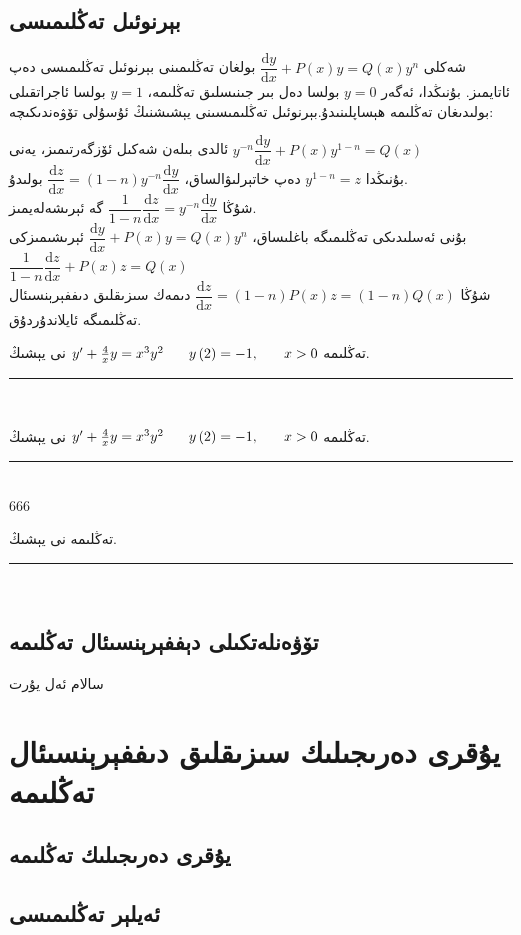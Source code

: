 \subsection{بېرنوئىل تەڭلىمىسى}
شەكلى
$\dfrac{\textrm{d}y}{\textrm{d}x}+P(x)y=Q(x)y^n$
بولغان تەڭلىمىنى بېرنوئىل تەڭلىمىسى دەپ ئاتايمىز. بۇنىڭدا، ئەگەر $y=0$ بولسا دەل بىر جىنىسلىق تەڭلىمە، $y=1$ بولسا ئاجراتقىلى بولىدىغان تەڭلىمە ھېساپلىنىدۇ.بېرنوئىل تەڭلىمىسىنى يېشىشنىڭ ئۇسۇلى تۆۋەندىكىچە:
\begin{colorful}[cyan]
ئالدى بىلەن شەكىل ئۆزگەرتىمىز، يەنى 
$y^{-n}\dfrac{\textrm{d}y}{\textrm{d}x}+P(x)y^{1-n}=Q(x)$\\
بۇنىڭدا
$y^{1-n}=z$
دەپ خاتېرلىۋالساق،
$\dfrac{\textrm{d}z}{\textrm{d}x}=(1-n)y^{-n}\dfrac{\textrm{d}y}{\textrm{d}x}$
بولىدۇ.\\
شۇڭا 
$\dfrac{1}{1-n}\dfrac{\textrm{d}z}{\textrm{d}x}=y^{-n}\dfrac{\textrm{d}y}{\textrm{d}x}$
گە ئېرىشەلەيمىز.\\
بۇنى ئەسلىدىكى تەڭلىمىگە باغلىساق،
$\dfrac{\textrm{d}y}{\textrm{d}x}+P(x)y=Q(x)y^n$
ئېرىشىمىزكى
$\dfrac{1}{1-n}\dfrac{\textrm{d}z}{\textrm{d}x}+P(x)z=Q(x)$\\
شۇڭا
$\dfrac{\textrm{d}z}{\textrm{d}x}=(1-n)P(x)z=(1-n)Q(x)$
دىمەك سىزىقلىق دىففېرېنسىئال تەڭلىمىگە ئايلاندۇردۇق.
\end{colorful}

\begin{myexample}
	تەڭلىمە
	$y' + \frac{4}{x}y = {x^3}{y^2}\hspace{0.25in}y\left( 2 \right) =  - 1,\hspace{0.25in}x > 0$
	نى يېشىڭ.
	\\\rule{\linewidth}{0.05em}\\

\end{myexample}




\begin{myexample}
	تەڭلىمە
$y' + \frac{4}{x}y = {x^3}{y^2}\hspace{0.25in}y\left( 2 \right) =  - 1,\hspace{0.25in}x > 0$
	نى يېشىڭ.
	\\\rule{\linewidth}{0.05em}\\
666
\end{myexample}


\begin{myexample}
	تەڭلىمە
	نى يېشىڭ.
	\\\rule{\linewidth}{0.05em}\\

\end{myexample}


\subsection{تۆۋەنلەتكىلى دېففېرېنسىئال تەڭلىمە}
سالام ئەل يۇرت

\section{يۇقرى دەرىجىلىك سىزىقلىق دىففېرېنسىئال تەڭلىمە}
\subsection{يۇقرى دەرىجىلىك تەڭلىمە}
\subsection{ئەيلېر تەڭلىمىسى}


